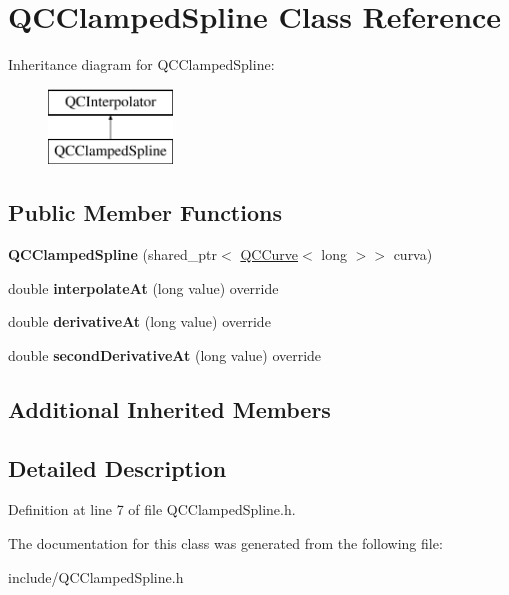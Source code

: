 \hypertarget{class_q_c_clamped_spline}{\section{Q\+C\+Clamped\+Spline Class Reference}
\label{class_q_c_clamped_spline}
}
Inheritance diagram for Q\+C\+Clamped\+Spline\+:\begin{figure}[H]
\begin{center}
\leavevmode
\includegraphics[height=2.000000cm]{class_q_c_clamped_spline}
\end{center}
\end{figure}
\subsection*{Public Member Functions}
\begin{DoxyCompactItemize}
\item 
\hypertarget{class_q_c_clamped_spline_af302b0106ede994e396db275f75fc4bf}{{\bfseries Q\+C\+Clamped\+Spline} (shared\+\_\+ptr$<$ \hyperlink{class_q_c_curve}{Q\+C\+Curve}$<$ long $>$$>$ curva)}\label{class_q_c_clamped_spline_af302b0106ede994e396db275f75fc4bf}

\item 
\hypertarget{class_q_c_clamped_spline_ad67f1624a00bd5760f9f086fe73805e6}{double {\bfseries interpolate\+At} (long value) override}\label{class_q_c_clamped_spline_ad67f1624a00bd5760f9f086fe73805e6}

\item 
\hypertarget{class_q_c_clamped_spline_ade6fba8584adad22700f464f84537fd6}{double {\bfseries derivative\+At} (long value) override}\label{class_q_c_clamped_spline_ade6fba8584adad22700f464f84537fd6}

\item 
\hypertarget{class_q_c_clamped_spline_a5ed512afe79288b3efd56690a2201380}{double {\bfseries second\+Derivative\+At} (long value) override}\label{class_q_c_clamped_spline_a5ed512afe79288b3efd56690a2201380}

\end{DoxyCompactItemize}
\subsection*{Additional Inherited Members}


\subsection{Detailed Description}


Definition at line 7 of file Q\+C\+Clamped\+Spline.\+h.



The documentation for this class was generated from the following file\+:\begin{DoxyCompactItemize}
\item 
include/Q\+C\+Clamped\+Spline.\+h\end{DoxyCompactItemize}

